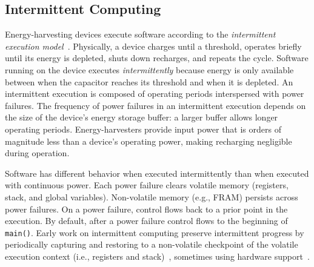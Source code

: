 \subsection{Intermittent Computing}
\label{sec:background_consistency}

Energy-harvesting devices execute software according to the {\em intermittent execution model}~\cite{dino,chain,alpaca,ratchet}. Physically, a device charges until a threshold, operates briefly until its energy is depleted, shuts down recharges, and repeats the cycle. Software running on the device executes {\em intermittently} because energy is only available between when the
capacitor reaches its threshold and when it is depleted. An intermittent execution is composed of operating periods interspersed with power failures. The frequency of power failures in an intermittent execution depends on the size of the device's energy storage buffer: a larger buffer allows longer operating periods. Energy-harvesters provide input power that is orders of magnitude less than a device's operating power, making recharging negligible during operation.

Software has different behavior when executed intermittently than when executed with continuous power.  Each power failure clears volatile memory (registers, stack, and global variables). Non-volatile memory (e.g., FRAM) persists across power failures. On a power failure, control flows back to a prior point in the execution. By default, after a power failure control flows to the beginning of {\tt main()}. Early work on intermittent computing preserve intermittent progress by periodically capturing and restoring to a non-volatile checkpoint of the volatile execution context (i.e., registers and stack)~\cite{mementos,quickrecall}, sometimes using hardware support~\cite{mementos,mottola2017harvos,hibernusplusplus,hibernus,idetic}. 

